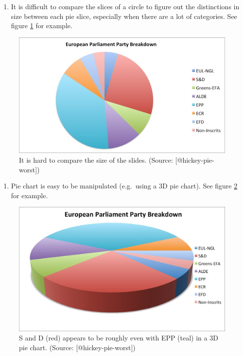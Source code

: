 \documentclass[]{book}
\providecommand{\tightlist}{%
  \setlength{\itemsep}{0pt}\setlength{\parskip}{0pt}}
\theoremstyle{definition}
\theoremstyle{definition}
\theoremstyle{definition}
\theoremstyle{remark}
\begin{document}
\begin{enumerate}
\def\labelenumi{\arabic{enumi}.}
\setcounter{enumi}{1}
\tightlist
\item
  It is difficult to compare the slices of a circle to figure out the
  distinctions in size between each pie slice, especially when there are
  a lot of categories. See figure \ref{fig:hickey-breakdown} for
  example.
\end{enumerate}

\begin{figure}
\includegraphics[width=0.7\linewidth]{images/hickey-breakdown} \caption{It is hard to compare the size of the slides. (Source: [@hickey-pie-worst])}\label{fig:hickey-breakdown}
\end{figure}

\begin{enumerate}
\def\labelenumi{\arabic{enumi}.}
\setcounter{enumi}{2}
\tightlist
\item
  Pie chart is easy to be manipulated (e.g.~using a 3D pie chart). See
  figure \ref{fig:hickey-3D} for example.
\end{enumerate}

\begin{figure}
\includegraphics[width=0.7\linewidth]{images/hickey-3D} \caption{S and D (red) appears to be roughly even with EPP (teal) in a 3D pie chart. (Source: [@hickey-pie-worst])}\label{fig:hickey-3D}
\end{figure}
\end{document}
